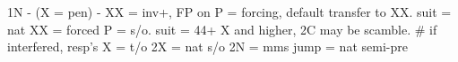 1N - (X = pen) -
XX = inv+, FP on
P = forcing, default transfer to XX.
    suit = nat
    XX = forced
        P = s/o. suit = 44+ X and higher, 2C may be scamble.
    # if interfered, resp's X = t/o
2X = nat s/o
2N = mms
jump = nat semi-pre